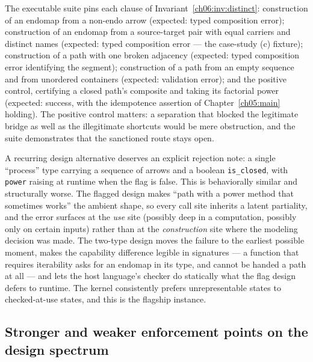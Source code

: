 \begin{checkclass}
\label{ch06:check:separation}
The executable suite pins each clause of
Invariant~\ref{ch06:inv:distinct}: construction of an endomap from a
non-endo arrow (expected: typed composition error); construction of an
endomap from a source-target pair with equal carriers and distinct names
(expected: typed composition error --- the case-study (c) fixture);
construction of a path with one broken adjacency (expected: typed
composition error identifying the segment); construction of a path from an
empty sequence and from unordered containers (expected: validation error);
and the positive control, certifying a closed path's composite and taking
its factorial power (expected: success, with the idempotence assertion of
Chapter~\ref{ch05:main} holding). The positive control matters: a
separation that blocked the legitimate bridge as well as the illegitimate
shortcuts would be mere obstruction, and the suite demonstrates that the
sanctioned route stays open.
\end{checkclass}

\begin{remark}
\label{ch06:rem:noflag}
A recurring design alternative deserves an explicit rejection note: a
single ``process'' type carrying a sequence of arrows and a boolean
\texttt{is\_closed}, with \texttt{power} raising at runtime when the flag
is false. This is behaviorally similar and structurally worse. The flagged
design makes ``path with a power method that sometimes works'' the
ambient shape, so every call site inherits a latent partiality, and the
error surfaces at the \emph{use} site (possibly deep in a computation,
possibly only on certain inputs) rather than at the \emph{construction}
site where the modeling decision was made. The two-type design moves the
failure to the earliest possible moment, makes the capability difference
legible in signatures --- a function that requires iterability asks for an
endomap in its type, and cannot be handed a path at all --- and lets the
host language's checker do statically what the flag design defers to
runtime. The kernel consistently prefers unrepresentable states to
checked-at-use states, and this is the flagship instance.
\end{remark}

\subsection{Stronger and weaker enforcement points on the design spectrum}
\label{ch06:sec:spectrum}

